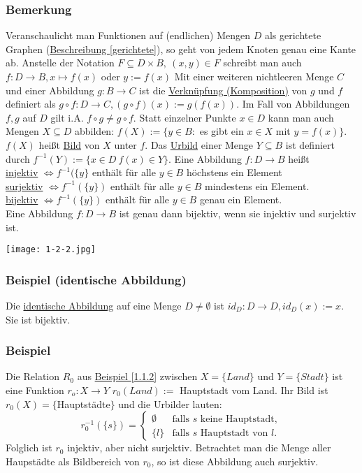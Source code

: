 \subsubsection{Bemerkung}
Veranschaulicht man Funktionen auf (endlichen) Mengen $D$ als gerichtete Graphen (\hyperref[gerichtete]{Beschreibung \ref*{gerichtete}}), so geht von jedem Knoten genau eine Kante ab.
Anstelle der Notation $F \subseteq D \times B,\ (x,y)\in F$ schreibt man auch $f:D\rightarrow B, x\mapsto f(x)$ oder $y:=f(x)$
Mit einer weiteren nichtleeren Menge $C$ und einer Abbildung $g:B\rightarrow C$ ist die \underline{Verknüpfung (Komposition)} von $g$ und $f$ definiert als $g\circ f: D\rightarrow C, (g\circ f)(x):=g(f(x))$.  Im Fall von Abbildungen $f,g$ auf $D$ gilt i.A. $f\circ g\not = g\circ f$.
Statt einzelner Punkte $x\in D$ kann man auch Mengen $X\subseteq D$ abbilden: $f(X):=\{y\in B:$ es gibt ein $x\in X$ mit $y=f(x)\}$.  $f(X)$ heißt \underline{Bild} von $X$ unter $f$.  Das \underline{Urbild} einer Menge $Y\subseteq B$ ist definiert durch $f^{-1}(Y):=\{x\in D\ f(x)\in Y\}$.  Eine Abbildung $f:D\rightarrow B$ heißt \\
\underline{injektiv} $\Leftrightarrow f^{-1}(\{y\}$ enthält für alle $y\in B$ höchstens ein Element \\
\underline{surjektiv} $\Leftrightarrow f^{-1}(\{y\})$ enthält für alle $y\in B$ mindestens ein Element. \\
\underline{bijektiv} $\Leftrightarrow f^{-1}(\{y\})$ enthält für alle $y\in B$ genau ein Element. \\
Eine Abbildung $f:D\rightarrow B$ ist genau dann bijektiv, wenn sie injektiv und surjektiv ist.\\
\begin{center}
\texttt{[image: 1-2-2.jpg]}
\end{center}
\subsubsection{Beispiel (identische Abbildung)}
\label{identische}
Die \underline{identische Abbildung} auf eine Menge $D\not = \emptyset$ ist $id_D:D\rightarrow D,id_D(x):=x$. Sie ist bijektiv.
\subsubsection*{Beispiel}
Die Relation $R_0$ aus \hyperref[1.1.2]{Beispiel \ref*{1.1.2}} zwischen $X=\{Land\}$ und $Y=\{Stadt\}$ ist eine Funktion $r_o :X\rightarrow Y$ $r_0(Land):=$ Hauptstadt vom Land.  Ihr Bild ist $r_0(X)=\{$Hauptstädte$\}$ und die Urbilder lauten:
\[r_0^{-1}(\{s\}) = \begin{cases}
\emptyset & \text{falls $s$ keine Hauptstadt},\\
\{l\}& \text{falls $s$ Hauptstadt von $l$}.
\end{cases}\]
Folglich ist $r_0$ injektiv, aber nicht surjektiv.  Betrachtet man die Menge aller Haupstädte als Bildbereich von $r_0$, so ist diese Abbildung auch surjektiv.
